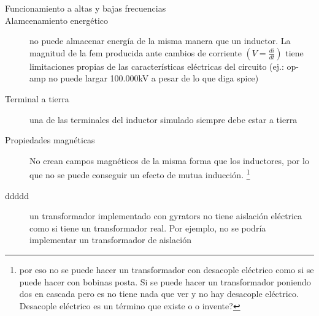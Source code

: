 \begin{description}
	\item[Funcionamiento a altas y bajas frecuencias]
	\todo[inline]
	
	\item[Alamcenamiento energ\'etico] no puede almacenar energ\'ia de la misma manera que un inductor. La magnitud de la fem producida ante cambios de corriente $\left( V = \frac{di}{dt} \right) $ tiene limitaciones propias de las caracter\'isticas el\'ectricas del circuito (ej.: op-amp no puede largar 100.000kV a pesar de lo que diga spice) 
	\item[Terminal a tierra] una de las terminales del inductor simulado siempre debe estar a tierra 
	
	\item[Propiedades magn\'eticas] No crean campos magn\'eticos de la misma forma que los inductores, por lo que no se puede conseguir un efecto de mutua inducci\'on. \footnote{por eso no se puede hacer un transformador con desacople el\'ectrico como si se puede hacer con bobinas posta. Si se puede hacer un transformador poniendo dos en cascada pero es no tiene nada que ver y no hay desacople el\'ectrico. Desacople el\'ectrico es un t\'ermino que existe o o invente?}
	
	\item[ddddd] un transformador implementado con gyrators no tiene aislaci\'on el\'ectrica como si tiene un transformador real. Por ejemplo, no se podr\'ia implementar un transformador de aislaci\'on 

\end{description}


